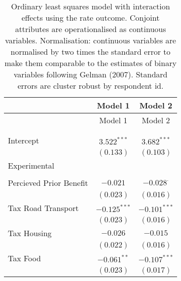 
\begin{center}
\begin{tiny}
\begin{longtable}{l@{} c@{} c@{}}
\hline
 & Model 1 & Model 2 \\
\hline
\endfirsthead
\hline
 & Model 1 & Model 2 \\
\hline
\endhead
\hline
\endfoot
\hline
\multicolumn{3}{l}{\tiny{$^{***}p<0.001$; $^{**}p<0.01$; $^{*}p<0.05$; $^{\cdot}p<0.1$}}\\
\caption{Ordinary least squares model with interaction effects using the rate outcome. Conjoint attributes are operationalised as continuous variables. Normalisation: continuous variables are normalised by two times
               the standard error to make them comparable to the estimates of binary variables following Gelman (2007). Standard errors are cluster robust by respondent id.}
\label{table:linear_interactions_exp_continuous}
\endlastfoot \\
Intercept                                              & $3.522^{***}$    & $3.682^{***}$    \\
                                                       & $(0.133)$        & $(0.103)$        \\
Experimental                                           &                  &                  \\
                                                       &                  &                  \\
\quad Percieved Prior Benefit                          & $-0.021$         & $-0.028^{\cdot}$ \\
                                                       & $(0.023)$        & $(0.016)$        \\
\quad Tax Road Transport                               & $-0.125^{***}$   & $-0.101^{***}$   \\
                                                       & $(0.023)$        & $(0.016)$        \\
\quad Tax Housing                                      & $-0.026$         & $-0.015$         \\
                                                       & $(0.022)$        & $(0.016)$        \\
\quad Tax Food                                         & $-0.061^{**}$    & $-0.107^{***}$   \\
                                                       & $(0.023)$        & $(0.017)$        \\

\end{longtable}
\end{tiny}
\end{center}
